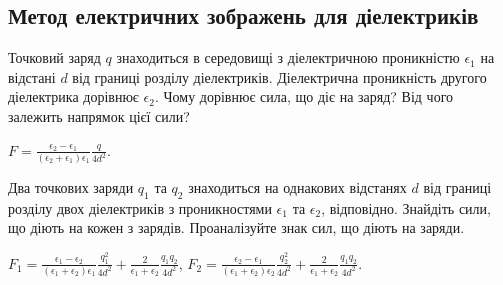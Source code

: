 \subsection*{Метод електричних зображень для діелектриків}

\begin{problem}
    Точковий заряд $q$ знаходиться в середовищі з діелектричною проникністю $\epsilon_1$ на відстані $d$ від границі розділу діелектриків. Діелектрична проникність другого діелектрика дорівнює $\epsilon_2$. Чому дорівнює сила, що діє на заряд? Від чого залежить напрямок цієї сили?
\begin{solution}
	$F = \frac{\epsilon_2 - \epsilon_1}{(\epsilon_2 + \epsilon_1)\epsilon_1} \frac{q}{4d^2}$.
\end{solution}
\end{problem}

\begin{problem}%
    Два точкових заряди $q_1$ та $q_2$ знаходиться на однакових відстанях $d$ від границі розділу двох діелектриків з проникностями $\epsilon_1$ та $\epsilon_2$, відповідно. Знайдіть сили, що діють на кожен з зарядів. Проаналізуйте знак сил, що діють на заряди.
\begin{solution}
	$F_1 = \frac{\epsilon_1 - \epsilon_2}{(\epsilon_1 + \epsilon_2)\epsilon_1} \frac{q_1^2}{4d^2} + \frac{2}{\epsilon_1 + \epsilon_2} \frac{q_1q_2}{4d^2}$,
	$F_2 = \frac{\epsilon_2 - \epsilon_1}{(\epsilon_1 + \epsilon_2)\epsilon_2} \frac{q_2^2}{4d^2} + \frac{2}{\epsilon_1 + \epsilon_2} \frac{q_1q_2}{4d^2}$.
\end{solution}
\end{problem}


